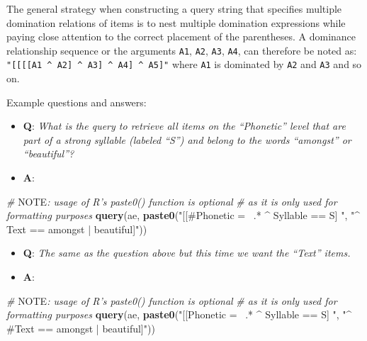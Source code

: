 \documentclass[]{book}
\newenvironment{Shaded}{\begin{snugshade}}{\end{snugshade}}
\newcommand{\AlertTok}[1]{\textcolor[rgb]{0.94,0.16,0.16}{#1}}
\newcommand{\CommentTok}[1]{\textcolor[rgb]{0.56,0.35,0.01}{\textit{#1}}}
\newcommand{\KeywordTok}[1]{\textcolor[rgb]{0.13,0.29,0.53}{\textbf{#1}}}
\newcommand{\NormalTok}[1]{#1}
\newcommand{\StringTok}[1]{\textcolor[rgb]{0.31,0.60,0.02}{#1}}
\providecommand{\tightlist}{%
  \setlength{\itemsep}{0pt}\setlength{\parskip}{0pt}}
\theoremstyle{definition}
\theoremstyle{definition}
\theoremstyle{definition}
\theoremstyle{remark}
\begin{document}
The general strategy when constructing a query string that specifies
multiple domination relations of items is to nest multiple domination
expressions while paying close attention to the correct placement of the
parentheses. A dominance relationship sequence or the arguments
\texttt{A1}, \texttt{A2}, \texttt{A3}, \texttt{A4}, can therefore be
noted as:
\texttt{"{[}{[}{[}{[}A1\ \^{}\ A2{]}\ \^{}\ A3{]}\ \^{}\ A4{]}\ \^{}\ A5{]}"}
where \texttt{A1} is dominated by \texttt{A2} and \texttt{A3} and so on.

Example questions and answers:

\begin{itemize}
\tightlist
\item
  \textbf{Q}: \emph{What is the query to retrieve all items on the
  ``Phonetic'' level that are part of a strong syllable (labeled ``S'')
  and belong to the words ``amongst'' or ``beautiful''?}
\item
  \textbf{A}:
\end{itemize}

\begin{Shaded}
\begin{Highlighting}[]
\CommentTok{# }\AlertTok{NOTE}\CommentTok{: usage of R's paste0() function is optional}
\CommentTok{# as it is only used for formatting purposes}
\KeywordTok{query}\NormalTok{(ae, }\KeywordTok{paste0}\NormalTok{(}\StringTok{"[[#Phonetic =~ .* ^ Syllable == S] "}\NormalTok{,}
                 \StringTok{"^ Text == amongst | beautiful]"}\NormalTok{))}
\end{Highlighting}
\end{Shaded}

\begin{itemize}
\tightlist
\item
  \textbf{Q}: \emph{The same as the question above but this time we want
  the ``Text'' items.}
\item
  \textbf{A}:
\end{itemize}

\begin{Shaded}
\begin{Highlighting}[]
\CommentTok{# }\AlertTok{NOTE}\CommentTok{: usage of R's paste0() function is optional}
\CommentTok{# as it is only used for formatting purposes}
\KeywordTok{query}\NormalTok{(ae, }\KeywordTok{paste0}\NormalTok{(}\StringTok{"[[Phonetic =~ .* ^ Syllable == S] "}\NormalTok{,}
                 \StringTok{"^ #Text == amongst | beautiful]"}\NormalTok{))}
\end{Highlighting}
\end{Shaded}
\end{document}
